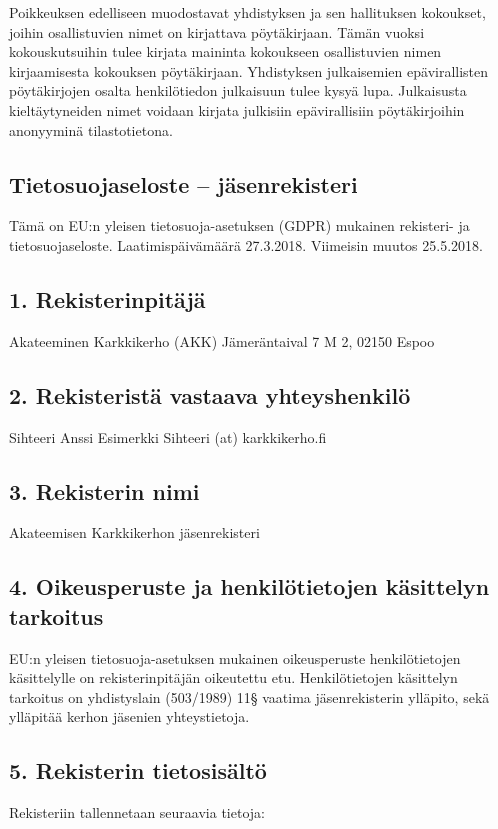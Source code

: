 \documentclass[finnish]{tktltiki}
\begin{document}
Poikkeuksen edelliseen muodostavat yhdistyksen ja sen hallituksen kokoukset, joihin osallistuvien nimet on kirjattava pöytäkirjaan. Tämän vuoksi kokouskutsuihin tulee kirjata maininta kokoukseen osallistuvien nimen kirjaamisesta kokouksen pöytäkirjaan. Yhdistyksen julkaisemien epävirallisten pöytäkirjojen osalta henkilötiedon julkaisuun tulee kysyä lupa. Julkaisusta kieltäytyneiden nimet voidaan kirjata julkisiin epävirallisiin pöytäkirjoihin anonyyminä tilastotietona.



\subsection*{Tietosuojaseloste – jäsenrekisteri}

Tämä on EU:n yleisen tietosuoja-asetuksen (GDPR) mukainen rekisteri- ja tietosuojaseloste. 
Laatimispäivämäärä 27.3.2018. Viimeisin muutos 25.5.2018.

\subsection*{1.	Rekisterinpitäjä}
Akateeminen Karkkikerho (AKK)
Jämeräntaival 7 M 2, 02150 Espoo 

\subsection*{2.	Rekisteristä vastaava yhteyshenkilö} 
Sihteeri Anssi Esimerkki
Sihteeri (at) karkkikerho.fi

\subsection*{3.	Rekisterin nimi}
Akateemisen Karkkikerhon jäsenrekisteri

\subsection*{4.	Oikeusperuste ja henkilötietojen käsittelyn tarkoitus}
EU:n yleisen tietosuoja-asetuksen mukainen oikeusperuste henkilötietojen käsittelylle on rekisterinpitäjän oikeutettu etu. 
Henkilötietojen käsittelyn tarkoitus on yhdistyslain (503/1989) 11§ vaatima jäsenrekisterin ylläpito, sekä ylläpitää kerhon jäsenien yhteystietoja.

\subsection*{5.	Rekisterin tietosisältö}
Rekisteriin tallennetaan seuraavia tietoja:
\end{document}
